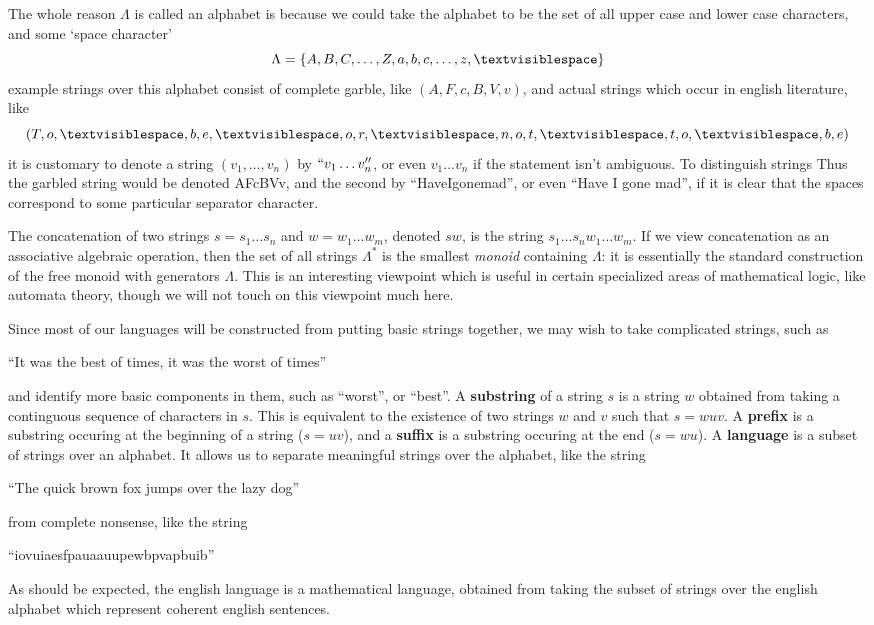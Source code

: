\begin{example}
    The whole reason $\Lambda$ is called an alphabet is because we could take the alphabet to be the set of all upper case and lower case characters, and some `space character'
    \[ \Lambda = \{ A,B,C,\dots,Z, a,b,c,\dots,z,\textvisiblespace \} \]
    example strings over this alphabet consist of complete garble, like $(A,F,c,B,V,v)$, and actual strings which occur in english literature, like
    \[ (T,o,\textvisiblespace,b,e,\textvisiblespace,o,r,\textvisiblespace,n,o,t,\textvisiblespace,t,o,\textvisiblespace,b,e) \]
    it is customary to denote a string $(v_1, \dots, v_n)$ by $``v_1 \dots v_n''$, or even $v_1 \dots v_n$ if the statement isn't ambiguous. To distinguish strings  Thus the garbled string would be denoted AFcBVv, and the second by ``Have\textvisiblespace I\textvisiblespace gone\textvisiblespace mad'', or even ``Have I gone mad'', if it is clear that the spaces correspond to some particular separator character.
\end{example}

The concatenation of two strings $s = s_1 \dots s_n$ and $w = w_1 \dots w_m$, denoted $sw$, is the string $s_1 \dots s_n w_1 \dots w_m$. If we view concatenation as an associative algebraic operation, then the set of all strings $\Lambda^*$ is the smallest {\it monoid} containing $\Lambda$: it is essentially the standard construction of the free monoid with generators $\Lambda$. This is an interesting viewpoint which is useful in certain specialized areas of mathematical logic, like automata theory, though we will not touch on this viewpoint much here.

Since most of our languages will be constructed from putting basic strings together, we may wish to take complicated strings, such as
%
\begin{center}
    ``It was the best of times, it was the worst of times''
\end{center}
%
and identify more basic components in them, such as ``worst'', or ``best''. A {\bf substring} of a string $s$ is a string $w$ obtained from taking a continguous sequence of characters in $s$. This is equivalent to the existence of two strings $w$ and $v$ such that $s = wuv$. A {\bf prefix} is a substring occuring at the beginning of a string ($s = uv$), and a {\bf suffix} is a substring occuring at the end ($s = wu$). A {\bf language} is a subset of strings over an alphabet. It allows us to separate meaningful strings over the alphabet, like the string
%
\begin{center}
    ``The quick brown fox jumps over the lazy dog''
\end{center}
%
from complete nonsense, like the string
%
\begin{center}
    ``iovuiaesfpauaauupewbpvapbuib''
\end{center}
%
As should be expected, the english language is a mathematical language, obtained from taking the subset of strings over the english alphabet which represent coherent english sentences.

